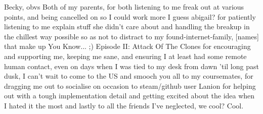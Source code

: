 Becky, obvs
Both of my parents, for both listening to me freak out at various points, and being cancelled on so I could work more
I guess abigail? for patiently listening to me explain stuff she didn't care about and handling the breakup in the chillest way possible so as not to distract
to my found-internet-family, [names] that make up You Know... ;) Episode II: Attack Of The Clones for encouraging and supporting me, keeping me sane, and ensuring I at least had some remote human contact, even on days when I was tied to my desk from dawn 'til long past dusk, I can't wait to come to the US and smooch you all
to my coursemates, for dragging me out to socialise on occasion
to steam/github user Lanion for helping out with a tough implementation detail and getting excited about the idea when I hated it the most 
and lastly to all the friends I've neglected, we cool? Cool.
